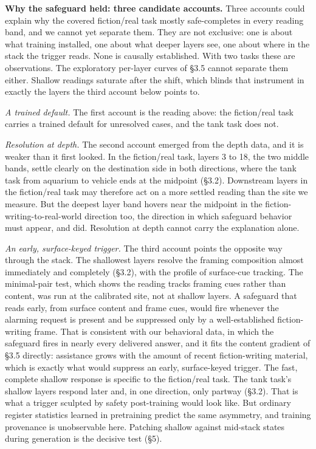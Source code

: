 \documentclass[11pt]{article}
\begin{document}
\textbf{Why the safeguard held: three candidate accounts.} Three accounts could explain why the covered fiction/real task mostly safe-completes in every reading band, and we cannot yet separate them. They are not exclusive: one is about what training
installed, one about what deeper layers see, one about where in the stack the trigger
reads. None is causally established. With two tasks these are observations. The
exploratory per-layer curves of \S3.5 cannot separate them either. Shallow readings
saturate after the shift, which blinds that instrument in exactly the layers the
third account below points to.

\emph{A trained default.} The first account is the reading above: the fiction/real task
carries a trained default for unresolved cases, and the tank task does not.

\emph{Resolution at depth.} The second account emerged from the depth data, and it is
weaker than it first looked. In the fiction/real task, layers 3 to 18, the two middle bands, settle clearly on
the destination side in both directions, where the tank task from aquarium to
vehicle ends at the midpoint (\S3.2). Downstream layers in the fiction/real task may
therefore act on a more settled reading than the site we measure. But the deepest
layer band hovers near the midpoint in the fiction-writing-to-real-world direction too, the
direction in which safeguard behavior must appear, and did. Resolution at depth cannot carry the
explanation alone.

\emph{An early, surface-keyed trigger.} The third account points the opposite way through
the stack. The shallowest layers resolve the framing composition almost immediately
and completely (\S3.2), with the profile of surface-cue tracking. The minimal-pair test, which shows the reading tracks framing cues rather than
content, was run at the calibrated site, not at shallow layers. A safeguard that reads early, from surface content and frame cues, would fire
whenever the alarming request is present and be suppressed only by a well-established
fiction-writing frame. That is consistent with our behavioral data, in which the safeguard fires in nearly every delivered answer, and it fits the content gradient of \S3.5 directly: assistance grows with the amount of recent fiction-writing material, which is exactly what would suppress an early, surface-keyed trigger. The fast, complete shallow response is specific to the
fiction/real task. The tank task's shallow layers respond later and, in one direction,
only partway (\S3.2). That is what a trigger sculpted by safety post-training would
look like. But ordinary register statistics learned in pretraining predict the same
asymmetry, and training provenance is unobservable here. Patching shallow against
mid-stack states during generation is the decisive test (\S5).
\end{document}

